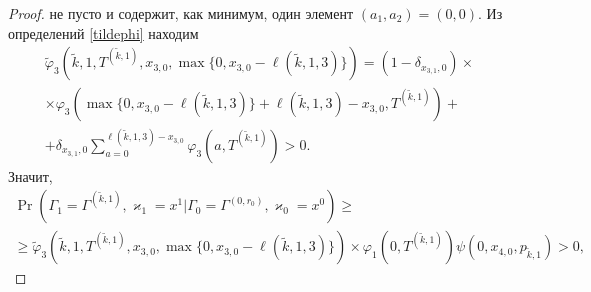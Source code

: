 \documentclass[a4paper,12pt,russian]{extarticle}
\begin{document}
\begin{proof}
не пусто и содержит, как минимум, один элемент $(a_1,a_2)=(0,0)$. Из определений \eqref{tildephi} находим
\begin{multline*}
\widetilde{\varphi}_3(\tilde{k},1,T^{(\tilde{k},1)},x_{3,0},\max{\{0,x_{3,0} - \ell(\tilde{k},1,3)\}})= (1-\delta_{x_{3,1},0}) \times \\\times\varphi_3(\max{\{0,x_{3,0} - \ell(\tilde{k},1,3)\}} + \ell (\tilde{k},1,3) - x_{3,0},T^{(\tilde{k},1)} ) 
+\\+\delta_{x_{3,1},0} \sum_{a=0}^{\ell(\tilde{k},1,3)-x_{3,0}}\varphi_3 (a,T^{(\tilde{k},1)})>0.
\end{multline*}
Значит,
\begin{multline*}
\Pr(\Gamma_{1}=\Gamma^{(\tilde{k},1)}, \varkappa_{1}=x^1|
\Gamma_{0}=\Gamma^{(0,r_0)}, \varkappa_{0}=x^0)\geqslant \\
\geqslant \widetilde{\varphi}_3(\tilde{k},1,T^{(\tilde{k},1)},x_{3,0},\max{\{0,x_{3,0} - \ell(\tilde{k},1,3)\}})
\times
\varphi_1(0,T^{(\tilde{k},1)})  \psi(0,x_{4,0}, p_{\tilde{k},1}) > 0,
\end{multline*}


\end{proof}
\end{document}
